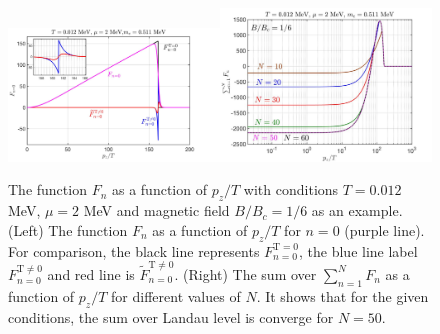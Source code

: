 \documentclass[sn-mathphys,Numbered]{sn-jnl}
\begin{document}
\begin{figure}[ht]
\centering
\includegraphics[width=0.5\textwidth]{./plot/NewFermi_Background}\includegraphics[width=0.5\textwidth]{./plot/NewFermi_SumChecking}
\caption{ The function $F_n$ as a function of $p_z/T$ with conditions $T=0.012$ MeV, $\mu=2$ MeV and magnetic field $B/B_c=1/6$ as an example.
(Left) The function $F_n$ as a function of $p_z/T$ for $n=0$ (purple line). For comparison, the black line represents $F_{n=0}^{\mathrm{T=0}}$, the blue line label $F_{n=0}^{\mathrm{T\neq0}}$ and red line is $\tilde F_{n=0}^{\mathrm{T\neq0}}$. (Right) The sum over $\sum_{n=1}^NF_n$ as a function of $p_z/T$ for different values of $N$. It shows that for the given conditions, the sum over Landau level is converge for $N=50$.}
\label{F0_Checking}
\end{figure}
\end{document}
